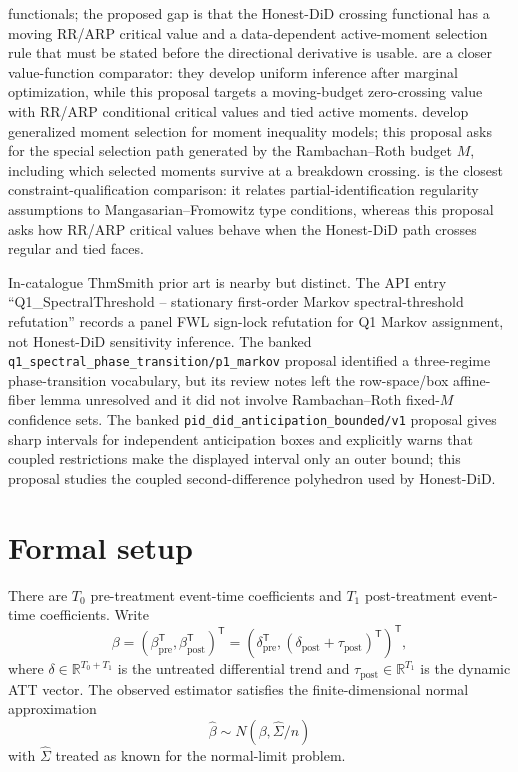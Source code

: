\documentclass[11pt]{article}
\newcommand{\transpose}{\mathsf{T}}
\theoremstyle{definition}
\theoremstyle{plain}
\theoremstyle{remark}
\begin{document}
functionals; the proposed gap is that the Honest-DiD crossing functional has a
moving RR/ARP critical value and a data-dependent active-moment selection rule
that must be stated before the directional derivative is usable.
\citet{FirpoGalvaoParker2023} are a closer value-function comparator: they
develop uniform inference after marginal optimization, while this proposal
targets a moving-budget zero-crossing value with RR/ARP conditional critical
values and tied active moments.
\citet{AndrewsSoares2010} develop generalized moment selection for moment
inequality models; this proposal asks for the special selection path generated
by the Rambachan--Roth budget \(M\), including which selected moments survive
at a breakdown crossing.  \citet{KaidoMolinariStoye2022} is the closest
constraint-qualification comparison: it relates partial-identification
regularity assumptions to Mangasarian--Fromowitz type conditions, whereas this
proposal asks how RR/ARP critical values behave when the Honest-DiD path
crosses regular and tied faces.

In-catalogue ThmSmith prior art is nearby but distinct.  The API entry
``Q1\_SpectralThreshold -- stationary first-order Markov spectral-threshold
refutation'' records a panel FWL sign-lock refutation for Q1 Markov assignment,
not Honest-DiD sensitivity inference.  The banked
\texttt{q1\_spectral\_phase\_transition/p1\_markov} proposal identified a
three-regime phase-transition vocabulary, but its review notes left the
row-space/box affine-fiber lemma unresolved and it did not involve
Rambachan--Roth fixed-\(M\) confidence sets.  The banked
\texttt{pid\_did\_anticipation\_bounded/v1} proposal gives sharp intervals for
independent anticipation boxes and explicitly warns that coupled restrictions
make the displayed interval only an outer bound; this proposal studies the
coupled second-difference polyhedron used by Honest-DiD.

\section{Formal setup}
There are \(T_0\) pre-treatment event-time coefficients and \(T_1\)
post-treatment event-time coefficients.  Write
\[
\beta=(\beta_{\mathrm{pre}}^\transpose,\beta_{\mathrm{post}}^\transpose)^\transpose
=
(\delta_{\mathrm{pre}}^\transpose,
(\delta_{\mathrm{post}}+\tau_{\mathrm{post}})^\transpose)^\transpose,
\]
where \(\delta\in\mathbb{R}^{T_0+T_1}\) is the untreated differential trend
and \(\tau_{\mathrm{post}}\in\mathbb{R}^{T_1}\) is the dynamic ATT vector.
The observed estimator satisfies the finite-dimensional normal approximation
\[
\widehat\beta \sim N(\beta,\widehat\Sigma/n)
\]
with \(\widehat\Sigma\) treated as known for the normal-limit problem.
\end{document}
